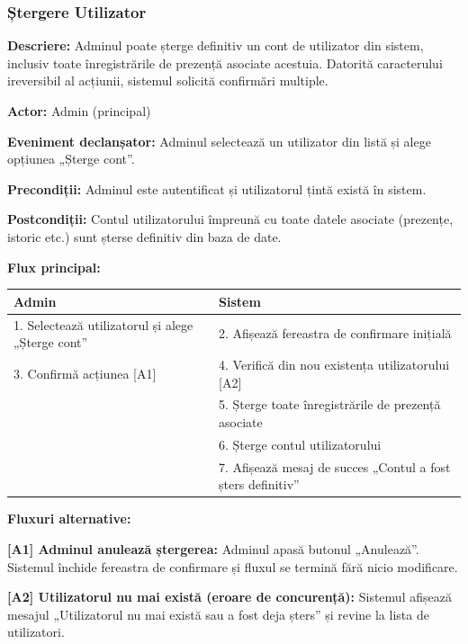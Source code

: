 \documentclass[11pt]{article}
\begin{document}
\subsubsection{Ștergere Utilizator}


\textbf{Descriere:} Adminul poate șterge definitiv un cont de utilizator din sistem, inclusiv toate înregistrările de prezență asociate acestuia. Datorită caracterului ireversibil al acțiunii, sistemul solicită confirmări multiple.

\textbf{Actor:} Admin (principal)

\textbf{Eveniment declanșator:} Adminul selectează un utilizator din listă și alege opțiunea „Șterge cont”.

\textbf{Precondiții:} Adminul este autentificat și utilizatorul țintă există în sistem.

\textbf{Postcondiții:} Contul utilizatorului împreună cu toate datele asociate (prezențe, istoric etc.) sunt șterse definitiv din baza de date.

\textbf{Flux principal:}

\begin{tabular}{l l}
\hline
\textbf{Admin} & \textbf{Sistem} \\
\hline
1. Selectează utilizatorul și alege „Șterge cont” & 2. Afișează fereastra de confirmare inițială \\
3. Confirmă acțiunea [A1] & 4. Verifică din nou existența utilizatorului [A2] \\
 & 5. Șterge toate înregistrările de prezență asociate \\
 & 6. Șterge contul utilizatorului \\
 & 7. Afișează mesaj de succes „Contul a fost șters definitiv” \\
\hline
\end{tabular}

\textbf{Fluxuri alternative:}

\textbf{[A1] Adminul anulează ștergerea:}  
Adminul apasă butonul „Anulează”. Sistemul închide fereastra de confirmare și fluxul se termină fără nicio modificare.

\textbf{[A2] Utilizatorul nu mai există (eroare de concurență):}  
Sistemul afișează mesajul „Utilizatorul nu mai există sau a fost deja șters” și revine la lista de utilizatori.
\end{document}

